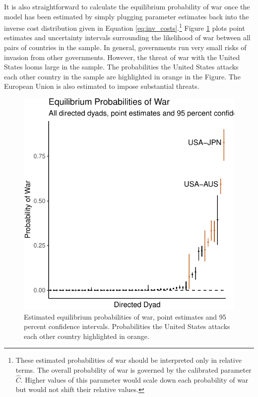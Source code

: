 \documentclass{puthesis}
\begin{document}
It is also straightforward to calculate the equilibrium probability of
war once the model has been estimated by simply plugging parameter
estimates back into the inverse cost distribution given in Equation
\ref{eq:inv_costs}.\footnote{These estimated probabilities of war should
  be interpreted only in relative terms. The overall probability of war
  is governed by the calibrated parameter \(\hat{C}\). Higher values of
  this parameter would scale down each probability of war but would not
  shift their relative values.} Figure \ref{fig:pr_peace} plots point
estimates and uncertainty intervals surrounding the likelihood of war
between all pairs of countries in the sample. In general, governments
run very small risks of invasion from other governments. However, the
threat of war with the United States looms large in the sample. The
probabilities the United States attacks each other country in the sample
are highlighted in orange in the Figure. The European Union is also
estimated to impose substantial threats.

\begin{figure}
\centering
\includegraphics{figure/war_probs-1.pdf}
\caption{Estimated equilibrium probabilities of war, point estimates and
95 percent confidence intervals. Probabilities the United States attacks
each other country highlighted in orange. \label{fig:pr_peace}}
\end{figure}
\end{document}

